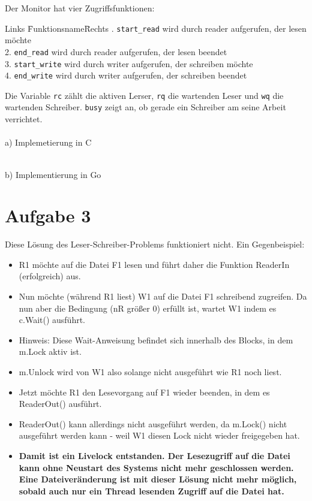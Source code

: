 \documentclass[11pt,a4paper,DIV=10,]{scrartcl}
\begin{document}
Der Monitor hat vier Zugriffsfunktionen: 
\begin{tabbing}
Links \= Funktionsname\= Rechts .\> \texttt{start\_read} \> wird durch reader aufgerufen, der lesen möchte \\
2.\> \texttt{end\_read} \>  wird durch reader aufgerufen, der lesen beendet\\
3.\> \texttt{start\_write} \> wird durch writer aufgerufen, der schreiben möchte \\
4.\> \texttt{end\_write} \> wird durch writer aufgerufen, der schreiben beendet \\
\end{tabbing}
Die Variable \texttt{rc} zählt die aktiven Lerser, \texttt{rq} die wartenden Leser und \texttt{wq} die wartenden Schreiber. \texttt{busy} zeigt an, ob gerade ein Schreiber am seine Arbeit verrichtet. \\ \\
a) Implemetierung in C
\begin{multicols}{2}[]

\end{multicols}
\ \\
b) Implementierung in Go
\begin{multicols}{2}[]

\end{multicols}

\section*{Aufgabe 3}
Diese Lösung des Leser-Schreiber-Problems funktioniert nicht. Ein Gegenbeispiel: 
\begin{itemize}
 \item R1 möchte auf die Datei F1 lesen und führt daher die Funktion ReaderIn (erfolgreich) aus.
 \item Nun möchte (während R1 liest) W1 auf die Datei F1 schreibend zugreifen. Da nun aber die Bedingung (nR größer 0) erfüllt ist, wartet W1 indem es c.Wait() ausführt. 
 \item Hinweis: Diese Wait-Anweisung befindet sich innerhalb des Blocks, in dem m.Lock aktiv ist. 
 \item m.Unlock wird von W1 also solange nicht ausgeführt wie R1 noch liest. 
 \item Jetzt möchte R1 den Lesevorgang auf F1 wieder beenden, in dem es ReaderOut() ausführt. 
 \item ReaderOut() kann allerdings nicht ausgeführt werden, da m.Lock() nicht ausgeführt werden kann - weil W1 diesen Lock nicht wieder freigegeben hat. 
 \item \textbf{Damit ist ein Livelock entstanden. Der Lesezugriff auf die Datei kann ohne Neustart des Systems nicht mehr geschlossen werden. Eine Datei\-veränderung ist mit dieser Lösung nicht mehr möglich, sobald auch nur ein Thread lesenden Zugriff auf die Datei hat.}
\end{itemize}
\end{document}
